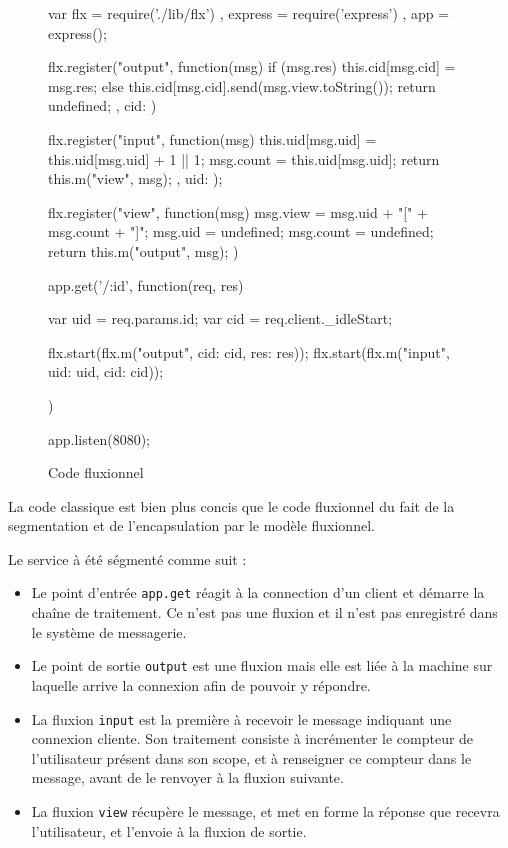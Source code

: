 \begin{figure}
  \begin{code}
  var flx = require('./lib/flx')
    , express = require('express')
    , app = express();

  flx.register("output", function(msg){
    if (msg.res) {
      this.cid[msg.cid] = msg.res;
    } else {
      this.cid[msg.cid].send(msg.view.toString());
    }
    return undefined;
  }, {
    cid: {}
  })

  flx.register("input", function(msg){
    this.uid[msg.uid] = this.uid[msg.uid] + 1 || 1;
    msg.count = this.uid[msg.uid];
    return this.m("view", msg);
  },{
    uid: {}
  });

  flx.register("view", function(msg) {
    msg.view = msg.uid + "[" + msg.count + "]";
    msg.uid = undefined;
    msg.count = undefined;
    return this.m("output", msg);
  })

  app.get('/:id', function(req, res) {
    var uid = req.params.id;
    var cid = req.client._idleStart;

    flx.start(flx.m("output", {cid: cid, res: res}));
    flx.start(flx.m("input", {uid: uid, cid: cid}));
  })

  app.listen(8080);
  \end{code}
  \caption{Code fluxionnel}
  \label{lst:fluxionnel}
\end{figure}

La code classique est bien plus concis que le code fluxionnel du fait de la segmentation et de l'encapsulation  par le modèle fluxionnel.

Le service à été ségmenté comme suit :
\begin{itemize}
  \item Le point d'entrée \texttt{app.get} réagit à la connection d'un client et démarre la chaîne de traitement.
  Ce n'est pas une fluxion et il n'est pas enregistré dans le système de messagerie.
  \item Le point de sortie \texttt{output} est une fluxion mais elle est liée à la machine sur laquelle arrive la connexion afin de pouvoir y répondre.
  \item La fluxion \texttt{input} est la première à recevoir le message indiquant une connexion cliente. Son traitement consiste à incrémenter le compteur de l'utilisateur présent dans son scope, et à renseigner ce compteur dans le message, avant de le renvoyer à la fluxion suivante.
  \item La fluxion \texttt{view} récupère le message, et met en forme la réponse que recevra l'utilisateur, et l'envoie à la fluxion de sortie.
\end{itemize}

